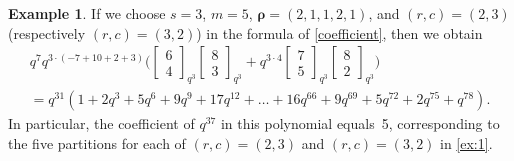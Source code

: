 \documentclass[12pt,reqno]{amsart}
\numberwithin{equation}{section}
\theoremstyle{definition}
\newtheorem{example}[theorem]{Example}
\newcommand{\rem}{{\boldsymbol\rho}}
\begin{document}
\begin{example}
If we choose $s=3$, $m=5$, $\rem=(2,1,1,2,1)$, and $(r,c)=(2,3)$
(respectively $(r,c)=(3,2)$) in the formula of \cref{coefficient},
then we obtain
\begin{multline*}
q^{7}  q^{3\cdot(-7+10+2+3)} \bigg(\begin{bmatrix} 6 \\ 4 \end{bmatrix}_{q^3}\begin{bmatrix} 8 \\ 3\end{bmatrix}_{q^3}
    +q^{3\cdot4}\begin{bmatrix} 7 \\ 5 \end{bmatrix}_{q^3}
\begin{bmatrix} 8 \\ 2 \end{bmatrix}_{q^3} \bigg)\\
=q^{31}\left(1+2q^3+5q^6+9q^9+17q^{12}+\dots+16 q^{66}+
9q^{69}+5q^{72}+2q^{75}+q^{78}\right).
\end{multline*}
In particular, the coefficient of $q^{37}$ in this polynomial
equals~5, corresponding to the five partitions for each of
$(r,c)=(2,3)$ and $(r,c)=(3,2)$ in \cref{ex:1}.
\end{example}
\end{document}
